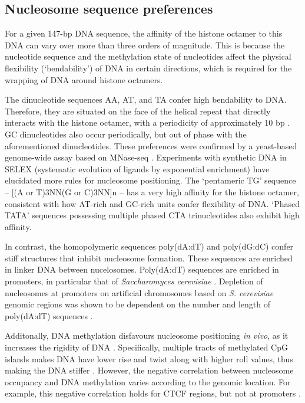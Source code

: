 \documentclass[parskip=full, numbers=noenddot]{scrbook}
\begin{document}
\subsection{Nucleosome sequence preferences}
\label{ssec:emsaselex_intro_seqpref}

For a given 147-bp DNA sequence, the affinity of the histone octamer to this DNA can vary over more than three orders of magnitude.  This is because the nucleotide sequence and the methylation state of nucleotides affect the physical flexibility (`bendability') of DNA in certain directions, which is required for the wrapping of DNA around histone octamers.

The dinucleotide sequences AA, AT, and TA confer high bendability to DNA.  Therefore, they are situated on the face of the helical repeat that directly interacts with the histone octamer, with a periodicity of approximately 10 bp \citep{struhl_determinants_2013}.  GC dinucleotides also occur periodically, but out of phase with the aforementioned dinucleotides.  These preferences were confirmed by a yeast-based genome-wide assay based on MNase-seq \citep{segal_genomic_2006}.  Experiments with synthetic DNA in SELEX (systematic evolution of ligands by exponential enrichment) \citep{lowary_new_1998} have elucidated more rules for nucleosome positioning.  The `pentameric TG' sequence -- [(A or T)3NN(G or C)3NN]n -- has a very high affinity for the histone octamer, consistent with how AT-rich and GC-rich units confer flexibility of DNA.  `Phased TATA' sequences possessing multiple phased CTA trinucleotides also exhibit high affinity.

In contrast, the homopolymeric sequences poly(dA:dT) and poly(dG:dC) confer stiff structures that inhibit nucleosome formation.  These sequences are enriched in linker DNA between nucelosomes.  Poly(dA:dT) sequences are enriched in promoters, in particular that of \emph{Saccharomyces cerevisiae} \citep{struhl_determinants_2013}.  Depletion of nucleosomes at promoters on artificial chromosomes based on \emph{S. cerevisiae} genomic regions was shown to be dependent on the number and length of poly(dA:dT) sequences \citep{hughes_functional_2012}.

Additonally, DNA methylation disfavours nucleosome positioning \emph{in vivo}, as it increases the rigidity of DNA \citep{huff_dnmt1-independent_2014}.  Specifically, multiple tracts of methylated CpG islands makes DNA have lower rise and twist along with higher roll values, thus making the DNA stiffer \citep{rao_systematic_2018, perez_impact_2012}.  However, the negative correlation between nucleosome occupancy and DNA methylation varies according to the genomic location.  For example, this negative correlation holds for CTCF regions, but not at promoters \citep{kelly_genome-wide_2012}.
\end{document}
